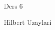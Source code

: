 \documentclass[12pt,fleqn]{article}\usepackage{../common}
\begin{document}
Ders 6

Hilbert Uzaylari 
\end{document}
